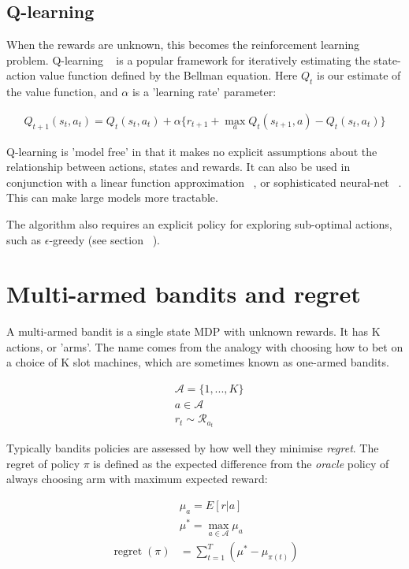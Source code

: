 \documentclass[11pt,a4,singlespacing,titlepagenumber=on]{scrreprt}
\numberwithin{equation}{chapter} %
\theoremstyle{remark}
\begin{document}
\subsection{ Q-learning }

When the rewards are unknown, this becomes the reinforcement learning problem. Q-learning ~\cite{watkins1992q} is a popular framework for iteratively estimating the state-action value function defined by the Bellman equation. Here $Q_t$ is our estimate of the value function, and $\alpha$ is a 'learning rate' parameter:

\begin{align}
Q_{t+1}(s_t,a_t) = Q_t(s_t,a_t) + \alpha\{r_{t+1} + \max_a Q_t(s_{t+1},a) -Q_t(s_t,a_t)\}
\end{align}

Q-learning is 'model free' in that it makes no explicit assumptions about the relationship between actions, states and rewards. It can also be used in conjunction with a linear function approximation ~\cite{tsitsiklis1997analysis}, or sophisticated neural-net ~\cite{mnih2013playing}. This can make large models more tractable.

The algorithm also requires an explicit policy for exploring sub-optimal actions, such as $\epsilon$-greedy (see section ~).

\section{ Multi-armed bandits and regret}

A multi-armed bandit is a single state MDP with unknown rewards. It has K actions, or 'arms'. The name comes from the analogy with choosing how to bet on a choice of K slot machines, which are sometimes known as one-armed bandits.

\begin{align}
&\mathcal{A} = \{1,...,K\} \\
&a \in \mathcal{A} \\
&r_t \sim \mathcal{R}_{a_t} 
\end{align}

Typically bandits policies are assessed by how well they minimise \textit{regret}. The regret of policy $\pi$ is defined as the expected difference from the \textit{oracle} policy of always choosing arm with maximum expected reward:

\begin{align}
&\mu_a = E[r|a] \\
&\mu^{*} = \max_{a \in \mathcal{A}} \mu_a \\
\operatorname{regret}(\pi) &= \sum_{t=1}^T (\mu^{*} - \mu_{\pi(t)})
\end{align}
\end{document}
